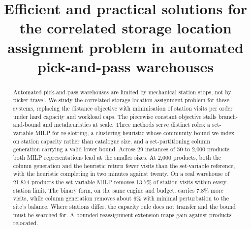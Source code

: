 \documentclass[]{interact}
\begin{document}

\title{Efficient and practical solutions for the correlated storage location assignment problem in automated pick-and-pass warehouses}

\author{
}

\maketitle

\begin{abstract}
Automated pick-and-pass warehouses are limited by mechanical station stops, not by picker travel. We study the correlated storage location assignment problem for these systems, replacing the distance objective with minimisation of station visits per order under hard capacity and workload caps. The piecewise constant objective stalls branch-and-bound and metaheuristics at scale. Three methods serve distinct roles: a set-variable MILP for re-slotting, a clustering heuristic whose community bound we index on station capacity rather than catalogue size, and a set-partitioning column generation carrying a valid lower bound. Across 29 instances of 50 to 2,000 products both MILP representations lead at the smaller sizes. At 2,000 products, both the column generation and the heuristic return fewer visits than the set-variable reference, with the heuristic completing in two minutes against twenty. On a real warehouse of 21,874 products the set-variable MILP removes 13.7\% of station visits within every station limit. The binary form, on the same engine and budget, carries 7.8\% more visits, while column generation removes about 6\% with minimal perturbation to the site's balance. Where stations differ, the capacity rule does not transfer and the bound must be searched for. A bounded reassignment extension maps gain against products relocated.
\end{abstract}
\end{document}
